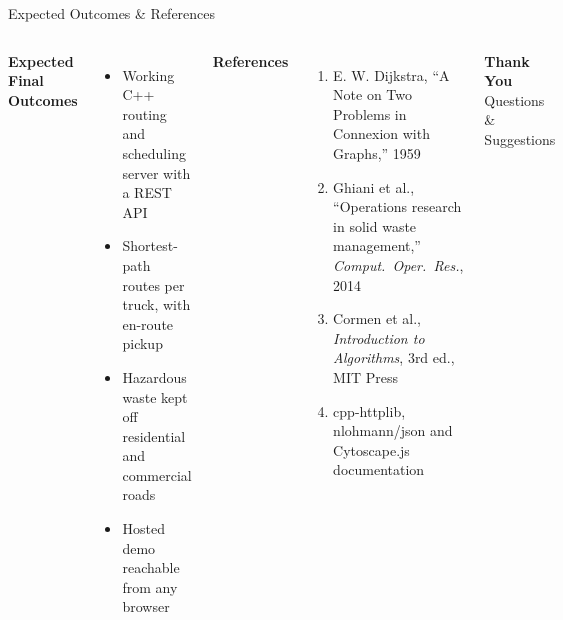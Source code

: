 \documentclass[aspectratio=169,11pt]{beamer}
\begin{document}
\begin{frame}{Expected Outcomes \& References}
\small

\begin{columns}[T,totalwidth=\textwidth]


\textbf{\color{GEUBlue}Expected Final Outcomes}

\begin{itemize}\itemsep1pt
\item Working C++ routing and scheduling server with a REST API
\item Shortest-path routes per truck, with en-route pickup
\item Hazardous waste kept off residential and commercial roads
\item Hosted demo reachable from any browser
\end{itemize}


\textbf{\color{GEUBlue}References}

\begin{enumerate}\itemsep0pt
\scriptsize
\item E. W. Dijkstra, ``A Note on Two Problems in Connexion with Graphs,'' 1959
\item Ghiani et al., ``Operations research in solid waste management,'' \textit{Comput.\ Oper.\ Res.}, 2014
\item Cormen et al., \textit{Introduction to Algorithms}, 3rd ed., MIT Press
\item cpp-httplib, nlohmann/json and Cytoscape.js documentation
\end{enumerate}

\vspace{1mm}
\begin{center}

\colorbox{GEUBlue}{
\parbox{.78\textwidth}{
\centering
\color{white}
\textbf{Thank You}\\
Questions \& Suggestions
}}

\end{center}

\end{columns}

\end{frame}
\end{document}
